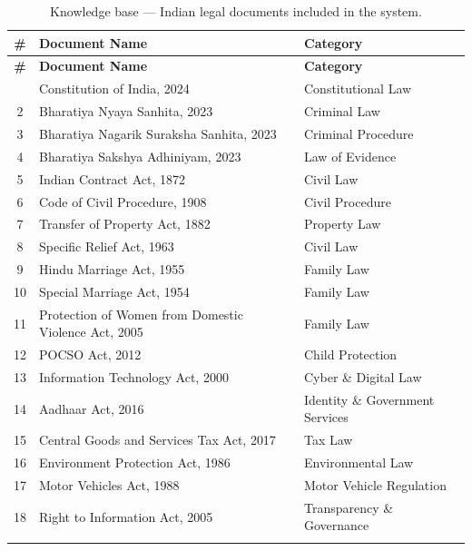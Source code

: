 \documentclass[12pt,a4paper]{article}
\begin{document}
\begin{longtable}{clp{4.5cm}}
  \toprule
  \textbf{\#} & \textbf{Document Name} & \textbf{Category} \\
  \midrule
  \endfirsthead
  \toprule
  \textbf{\#} & \textbf{Document Name} & \textbf{Category} \\
  \midrule
  \endhead
  \bottomrule
  \endfoot
  1  & Constitution of India, 2024                                  & Constitutional Law \\
  2  & Bharatiya Nyaya Sanhita, 2023                                & Criminal Law \\
  3  & Bharatiya Nagarik Suraksha Sanhita, 2023                     & Criminal Procedure \\
  4  & Bharatiya Sakshya Adhiniyam, 2023                            & Law of Evidence \\
  5  & Indian Contract Act, 1872                                    & Civil Law \\
  6  & Code of Civil Procedure, 1908                                & Civil Procedure \\
  7  & Transfer of Property Act, 1882                               & Property Law \\
  8  & Specific Relief Act, 1963                                    & Civil Law \\
  9  & Hindu Marriage Act, 1955                                     & Family Law \\
  10 & Special Marriage Act, 1954                                   & Family Law \\
  11 & Protection of Women from Domestic Violence Act, 2005         & Family Law \\
  12 & POCSO Act, 2012                                              & Child Protection \\
  13 & Information Technology Act, 2000                             & Cyber \& Digital Law \\
  14 & Aadhaar Act, 2016                                            & Identity \& Government Services \\
  15 & Central Goods and Services Tax Act, 2017                     & Tax Law \\
  16 & Environment Protection Act, 1986                             & Environmental Law \\
  17 & Motor Vehicles Act, 1988                                     & Motor Vehicle Regulation \\
  18 & Right to Information Act, 2005                               & Transparency \& Governance \\
  \bottomrule
  \caption{Knowledge base --- Indian legal documents included in the system.}
  \label{tab:knowledge-base}
\end{longtable}
\end{document}
